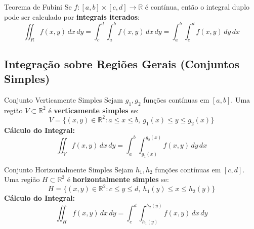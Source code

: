 \documentclass[11pt,a4paper]{article}
\newcommand{\R}{\mathbb{R}}
\begin{document}
\noindent\begin{theorembox}{Teorema de Fubini}
  Se $f : [a, b] \times [c, d] \to \R$ é contínua, então o integral duplo pode ser calculado por \textbf{integrais iterados}:
  \[ \iint_R f(x, y) \, dx \, dy = \int_c^d \int_a^b f(x, y) \, dx \, dy = \int_a^b \int_c^d f(x, y) \, dy \, dx \]
\end{theorembox}

\subsection{Integração sobre Regiões Gerais (Conjuntos Simples)}

\noindent\begin{minipage}[t]{0.49\textwidth}
  \begin{definitionbox}{Conjunto Verticamente Simples}
    Sejam $g_1, g_2$ funções contínuas em $[a, b]$. Uma região $V \subset \R^2$ é \textbf{verticamente simples} se:
    \[ V = \{(x, y) \in \R^2 : a \le x \le b, \ g_1(x) \le y \le g_2(x)\} \]
    \textbf{Cálculo do Integral:}
    \[ \iint_V f(x, y) \, dx \, dy = \int_a^b \int_{g_1(x)}^{g_2(x)} f(x, y) \, dy \, dx \]
  \end{definitionbox}
\end{minipage}\hfill
\begin{minipage}[t]{0.49\textwidth}
  \begin{definitionbox}{Conjunto Horizontalmente Simples}
    Sejam $h_1, h_2$ funções contínuas em $[c, d]$. Uma região $H \subset \R^2$ é \textbf{horizontalmente simples} se:
    \[ H = \{(x, y) \in \R^2 : c \le y \le d, \ h_1(y) \le x \le h_2(y)\} \]
    \textbf{Cálculo do Integral:}
    \[ \iint_H f(x, y) \, dx \, dy = \int_c^d \int_{h_1(y)}^{h_2(y)} f(x, y) \, dx \, dy \]
  \end{definitionbox}
\end{minipage}

\vspace{0.3em}
\end{document}
